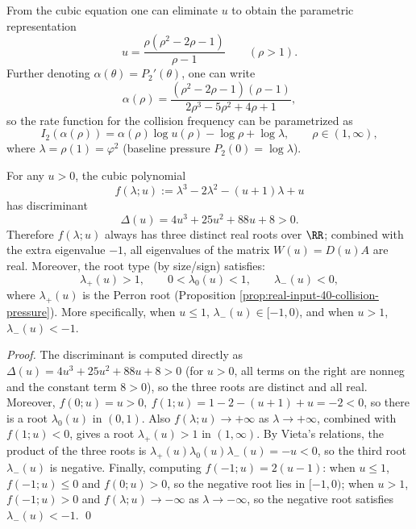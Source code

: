 \begin{remark}\label{rem:real-input-40-collision-ldp-param}
From the cubic equation one can eliminate $u$ to obtain the parametric representation
\[
u=\frac{\rho(\rho^2-2\rho-1)}{\rho-1}\qquad(\rho>1).
\]
Further denoting $\alpha(\theta)=P_2'(\theta)$, one can write
\[
\alpha(\rho)=\frac{(\rho^2-2\rho-1)(\rho-1)}{2\rho^3-5\rho^2+4\rho+1},
\]
so the rate function for the collision frequency can be parametrized as
\[
I_2(\alpha(\rho))=\alpha(\rho)\log u(\rho)-\log\rho+\log\lambda,\qquad \rho\in(1,\infty),
\]
where \(\lambda=\rho(1)=\varphi^2\) (baseline pressure \(P_2(0)=\log\lambda\)).
\end{remark}

\begin{proposition}\label{prop:real-input-40-collision-all-real}
For any \(u>0\), the cubic polynomial
\[
f(\lambda;u):=\lambda^3-2\lambda^2-(u+1)\lambda+u
\]
has discriminant
\[
\Delta(u)=4u^3+25u^2+88u+8>0.
\]
Therefore \(f(\lambda;u)\) always has three distinct real roots over \(\RR\); combined with the extra eigenvalue \(-1\), all eigenvalues of the matrix \(W(u)=D(u)A\) are real.
Moreover, the root type (by size/sign) satisfies:
\[
\lambda_+(u)>1,\qquad 0<\lambda_0(u)<1,\qquad \lambda_-(u)<0,
\]
where \(\lambda_+(u)\) is the Perron root (Proposition \ref{prop:real-input-40-collision-pressure}).
More specifically, when \(u\le 1\), \(\lambda_-(u)\in[-1,0)\), and when \(u>1\), \(\lambda_-(u)<-1\).
\end{proposition}
\begin{proof}
The discriminant is computed directly as \(\Delta(u)=4u^3+25u^2+88u+8>0\) (for \(u>0\), all terms on the right are nonneg and the constant term \(8>0\)), so the three roots are distinct and all real.
Moreover, \(f(0;u)=u>0,\ f(1;u)=1-2-(u+1)+u=-2<0\), so there is a root \(\lambda_0(u)\) in \((0,1)\).
Also \(f(\lambda;u)\to+\infty\) as \(\lambda\to+\infty\), combined with \(f(1;u)<0\), gives a root \(\lambda_+(u)>1\) in \((1,\infty)\).
By Vieta's relations, the product of the three roots is \(\lambda_+(u)\lambda_0(u)\lambda_-(u)=-u<0\), so the third root \(\lambda_-(u)\) is negative.
Finally, computing
\(
f(-1;u)=2(u-1)
\):
when \(u\le 1\), \(f(-1;u)\le 0\) and \(f(0;u)>0\), so the negative root lies in \([-1,0)\);
when \(u>1\), \(f(-1;u)>0\) and \(f(\lambda;u)\to-\infty\) as \(\lambda\to-\infty\), so the negative root satisfies \(\lambda_-(u)<-1\).
\qed
\end{proof}

